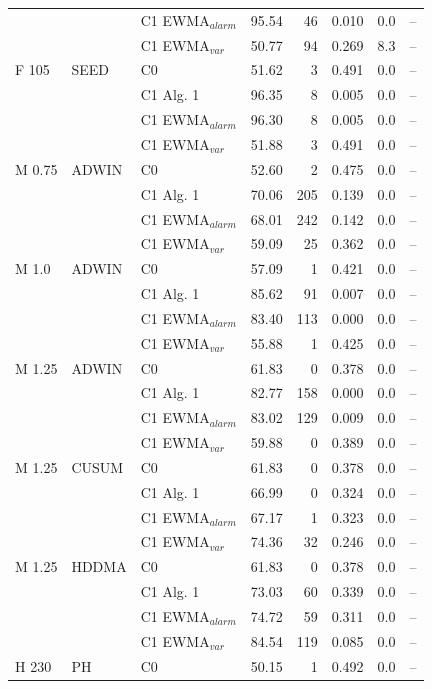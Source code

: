 \begin{longtable}{lllrrrrr}
 &  & C1 EWMA$_{alarm}$ & 95.54 & 46 & 0.010 & 0.0 & -- \\
 &  & C1 EWMA$_{var}$ & 50.77 & 94 & 0.269 & 8.3 & -- \\
\hline
F  105 & SEED & C0 & 51.62 & 3 & 0.491 & 0.0 & -- \\
 &  & C1 Alg. 1 & 96.35 & 8 & 0.005 & 0.0 & -- \\
 &  & C1 EWMA$_{alarm}$ & 96.30 & 8 & 0.005 & 0.0 & -- \\
 &  & C1 EWMA$_{var}$ & 51.88 & 3 & 0.491 & 0.0 & -- \\
\hline
M  0.75 & ADWIN & C0 & 52.60 & 2 & 0.475 & 0.0 & -- \\
 &  & C1 Alg. 1 & 70.06 & 205 & 0.139 & 0.0 & -- \\
 &  & C1 EWMA$_{alarm}$ & 68.01 & 242 & 0.142 & 0.0 & -- \\
 &  & C1 EWMA$_{var}$ & 59.09 & 25 & 0.362 & 0.0 & -- \\
\hline
M  1.0 & ADWIN & C0 & 57.09 & 1 & 0.421 & 0.0 & -- \\
 &  & C1 Alg. 1 & 85.62 & 91 & 0.007 & 0.0 & -- \\
 &  & C1 EWMA$_{alarm}$ & 83.40 & 113 & 0.000 & 0.0 & -- \\
 &  & C1 EWMA$_{var}$ & 55.88 & 1 & 0.425 & 0.0 & -- \\
\hline
M  1.25 & ADWIN & C0 & 61.83 & 0 & 0.378 & 0.0 & -- \\
 &  & C1 Alg. 1 & 82.77 & 158 & 0.000 & 0.0 & -- \\
 &  & C1 EWMA$_{alarm}$ & 83.02 & 129 & 0.009 & 0.0 & -- \\
 &  & C1 EWMA$_{var}$ & 59.88 & 0 & 0.389 & 0.0 & -- \\
\hline
M  1.25 & CUSUM & C0 & 61.83 & 0 & 0.378 & 0.0 & -- \\
 &  & C1 Alg. 1 & 66.99 & 0 & 0.324 & 0.0 & -- \\
 &  & C1 EWMA$_{alarm}$ & 67.17 & 1 & 0.323 & 0.0 & -- \\
 &  & C1 EWMA$_{var}$ & 74.36 & 32 & 0.246 & 0.0 & -- \\
\hline
M  1.25 & HDDMA & C0 & 61.83 & 0 & 0.378 & 0.0 & -- \\
 &  & C1 Alg. 1 & 73.03 & 60 & 0.339 & 0.0 & -- \\
 &  & C1 EWMA$_{alarm}$ & 74.72 & 59 & 0.311 & 0.0 & -- \\
 &  & C1 EWMA$_{var}$ & 84.54 & 119 & 0.085 & 0.0 & -- \\
\hline
H  230 & PH & C0 & 50.15 & 1 & 0.492 & 0.0 & -- \\

\end{longtable}
